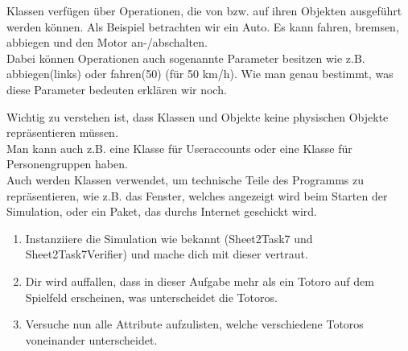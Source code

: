 \begin{Infobox}
    Klassen verfügen über Operationen, die von bzw. auf ihren Objekten ausgeführt werden können.
Als Beispiel betrachten wir ein Auto. Es kann fahren, bremsen, abbiegen und den Motor an-/abschalten.\\

Dabei können Operationen auch sogenannte Parameter besitzen wie z.B. abbiegen(links) oder fahren(50) (für 50 km/h).
Wie man genau bestimmt, was diese Parameter bedeuten erklären wir noch.
\end{Infobox}

\begin{Infobox}
Wichtig zu verstehen ist, dass Klassen und Objekte keine physischen Objekte repräsentieren müssen.\\
Man kann auch z.B. eine Klasse für Useraccounts oder eine Klasse für Personengruppen haben.\\
Auch werden Klassen verwendet, um technische Teile des Programms zu repräsentieren, wie z.B. das Fenster, welches angezeigt wird beim Starten der Simulation, oder ein Paket, das durchs Internet geschickt wird.
\end{Infobox}

\begin{enumerate}
\item Instanziiere die Simulation wie bekannt (Sheet2Task7 und Sheet2Task7Verifier) und mache dich mit dieser vertraut.
\item Dir wird auffallen, dass in dieser Aufgabe mehr als ein Totoro auf dem Spielfeld erscheinen, was unterscheidet die Totoros.
\item Versuche nun alle Attribute aufzulisten, welche verschiedene Totoros voneinander unterscheidet.
\end{enumerate}
